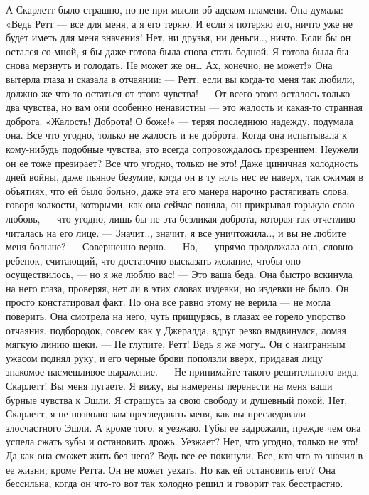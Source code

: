 А Скарлетт было страшно, но не при мысли об адском пламени. Она думала: «Ведь Ретт — все для меня, а я его теряю. И если я потеряю его, ничто уже не будет иметь для меня значения! Нет, ни друзья, ни деньги.., ничто. Если бы он остался со мной, я бы даже готова была снова стать бедной. Я готова была бы снова мерзнуть и голодать. Не может же он… Ах, конечно, не может!» Она вытерла глаза и сказала в отчаянии:
— Ретт, если вы когда-то меня так любили, должно же что-то остаться от этого чувства!
— От всего этого осталось только два чувства, но вам они особенно ненавистны — это жалость и какая-то странная доброта.
«Жалость! Доброта! О боже!» — теряя последнюю надежду, подумала она. Все что угодно, только не жалость и не доброта. Когда она испытывала к кому-нибудь подобные чувства, это всегда сопровождалось презрением. Неужели он ее тоже презирает? Все что угодно, только не это! Даже циничная холодность дней войны, даже пьяное безумие, когда он в ту ночь нес ее наверх, так сжимая в объятиях, что ей было больно, даже эта его манера нарочно растягивать слова, говоря колкости, которыми, как она сейчас поняла, он прикрывал горькую свою любовь, — что угодно, лишь бы не эта безликая доброта, которая так отчетливо читалась на его лице.
— Значит.., значит, я все уничтожила.., и вы не любите меня больше?
— Совершенно верно.
— Но, — упрямо продолжала она, словно ребенок, считающий, что достаточно высказать желание, чтобы оно осуществилось, — но я же люблю вас!
— Это ваша беда.
Она быстро вскинула на него глаза, проверяя, нет ли в этих словах издевки, но издевки не было. Он просто констатировал факт. Но она все равно этому не верила — не могла поверить. Она смотрела на него, чуть прищурясь, в глазах ее горело упорство отчаяния, подбородок, совсем как у Джералда, вдруг резко выдвинулся, ломая мягкую линию щеки.
— Не глупите, Ретт! Ведь я же могу…
Он с наигранным ужасом поднял руку, и его черные брови поползли вверх, придавая лицу знакомое насмешливое выражение.
— Не принимайте такого решительного вида, Скарлетт! Вы меня пугаете. Я вижу, вы намерены перенести на меня ваши бурные чувства к Эшли. Я страшусь за свою свободу и душевный покой. Нет, Скарлетт, я не позволю вам преследовать меня, как вы преследовали злосчастного Эшли. А кроме того, я уезжаю.
Губы ее задрожали, прежде чем она успела сжать зубы и остановить дрожь. Уезжает? Нет, что угодно, только не это! Да как она сможет жить без него? Ведь все ее покинули. Все, кто что-то значил в ее жизни, кроме Ретта. Он не может уехать. Но как ей остановить его? Она бессильна, когда он что-то вот так холодно решил и говорит так бесстрастно.
